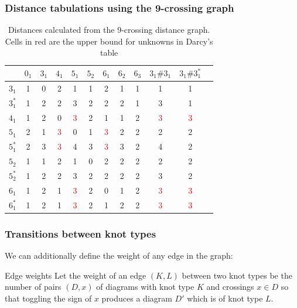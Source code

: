 \documentclass[presentation]{beamer}
\begin{document}
\begin{frame}
  \frametitle{Distance tabulations using the 9-crossing graph}
      \begin{table}
      \centering\small
      \begin{tabular}{r|ccccccccccc}
                & $0_1$ & $3_1$ & $4_1$      & $5_1$      & $5_2$ & $6_1$      & $6_2$ & $6_3$ & $3_1 \# 3_1$ & $3_1 \# 3_1^*$ \\
        \hline
        $3_1$   & 1     & 0     & 2          & 1          & 1     & 2          & 1     & 1     & 1            & 1              \\
        $3_1^*$ & 1     & 2     & 2          & 3          & 2     & 2          & 2     & 1     & 3            & 1              \\
        $4_1$   & 1     & 2     & 0          & \textcolor{red}{3} & 2     & 1          & 1     & 2     & \textcolor{red}{3}   & \textcolor{red}{3}     \\
        $5_1$   & 2     & 1     & \textcolor{red}{3} & 0          & 1     & \textcolor{red}{3} & 2     & 2     & 2            & 2              \\
        $5_1^*$ & 2     & 3     & \textcolor{red}{3} & 4          & 3     & \textcolor{red}{3} & 3     & 2     & 4            & 2              \\
        $5_2$   & 1     & 1     & 2          & 1          & 0     & 2          & 2     & 2     & 2            & 2              \\
        $5_2^*$ & 1     & 2     & 2          & 3          & 2     & 2          & 2     & 2     & 3            & 2              \\
        $6_1$   & 1     & 2     & 1          & \textcolor{red}{3} & 2     & 0          & 1     & 2     & \textcolor{red}{3}   & \textcolor{red}{3}     \\
        $6_1^*$ & 1     & 2     & 1          & \textcolor{red}{3} & 2     & 1          & 2     & 2     & \textcolor{red}{3}   & \textcolor{red}{3}     \\
      \end{tabular}
      \caption{Distances calculated from the 9-crossing distance
        graph. Cells in red are the upper bound for unknowns in Darcy's table}
      \label{fig:disttable}
    \end{table}

\end{frame}

\begin{frame}
  \frametitle{Transitions between knot types}
  We can additionally define the weight of any edge in the graph:

  \begin{block}{Edge weights}
    Let the weight of an edge $(K, L)$ between two knot types be the
    number of pairs $(D, x)$ of diagrams with knot type $K$ and
    crossings $x \in D$ so that toggling the sign of $x$ produces a
    diagram $D'$ which is of knot type $L$.
  \end{block}
\end{frame}
\end{document}
